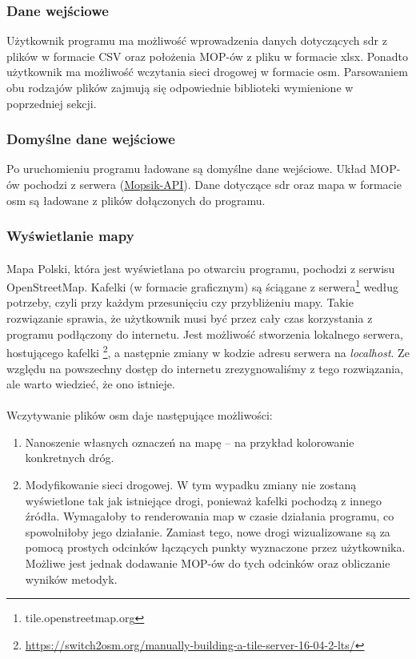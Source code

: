\subsubsection{Dane wejściowe}
Użytkownik programu ma możliwość wprowadzenia danych dotyczących \acrshort{sdr}
z plików w formacie CSV oraz położenia MOP-ów z pliku w formacie xlsx. 
Ponadto użytkownik ma możliwość wczytania sieci drogowej w
formacie \acrshort{osm}. Parsowaniem obu rodzajów plików zajmują się odpowiednie
biblioteki wymienione w poprzedniej sekcji.
\subsubsection{Domyślne dane wejściowe}
Po uruchomieniu programu ładowane są domyślne dane wejściowe. Układ MOP-ów
pochodzi z serwera (\hyperref[mopsik_api]{Mopsik-API}). Dane dotyczące \acrshort{sdr} oraz mapa w
formacie \acrshort{osm} są
ładowane z plików dołączonych do programu. 
\subsubsection{Wyświetlanie mapy}
\paragraph{} 
Mapa Polski, która jest wyświetlana po otwarciu programu, pochodzi z
serwisu \mbox{OpenStreetMap}\cite{osm}. Kafelki (w formacie graficznym) są ściągane z
serwera\footnote{tile.openstreetmap.org} według potrzeby, czyli
przy każdym przesunięciu czy przybliżeniu mapy. Takie rozwiązanie sprawia, że
użytkownik musi być przez cały czas korzystania z programu podłączony
do internetu. Jest możliwość stworzenia lokalnego serwera, hostującego
kafelki
\footnote{\url{https://switch2osm.org/manually-building-a-tile-server-16-04-2-lts/}}, a
następnie zmiany w kodzie adresu serwera na \textit{localhost}. Ze względu na
powszechny dostęp do internetu zrezygnowaliśmy z tego rozwiązania, ale warto
wiedzieć, że ono istnieje. 
\paragraph{}
Wczytywanie plików \acrshort{osm} daje następujące możliwości:
\begin{enumerate}
  \item Nanoszenie własnych oznaczeń na mapę -- na przykład kolorowanie
    konkretnych dróg.
  \item Modyfikowanie sieci drogowej. W tym wypadku zmiany nie zostaną
    wyświetlone tak jak istniejące drogi, ponieważ kafelki pochodzą z innego
    źródła. Wymagałoby to renderowania map w czasie działania programu, co
    spowolniłoby jego działanie. Zamiast tego, nowe drogi wizualizowane są
    za pomocą prostych odcinków łączących punkty wyznaczone przez użytkownika. 
    Możliwe jest jednak dodawanie MOP-ów do tych odcinków oraz obliczanie
    wyników metodyk.
\end{enumerate}
